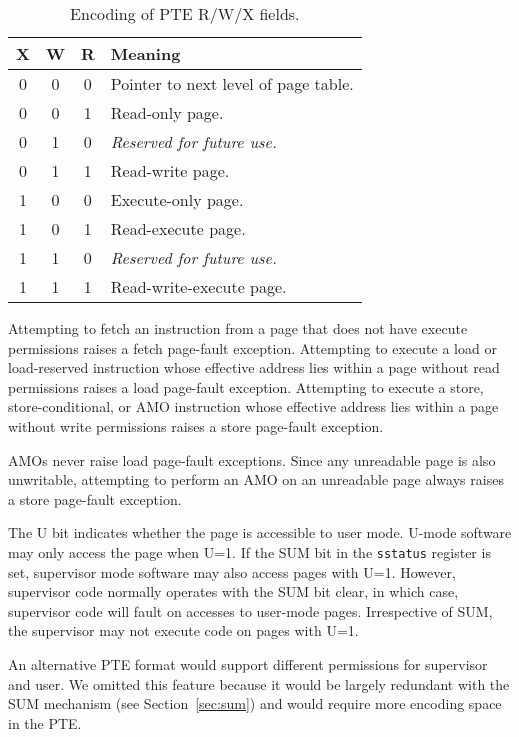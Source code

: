 \begin{table*}[h!]
\begin{center}
\begin{tabular}{|c|c|c||l|}
\hline
X & W & R & Meaning \\
\hline
0 & 0 & 0 & Pointer to next level of page table. \\
0 & 0 & 1 & Read-only page. \\
0 & 1 & 0 & {\em Reserved for future use.} \\
0 & 1 & 1 & Read-write page. \\
1 & 0 & 0 & Execute-only page. \\
1 & 0 & 1 & Read-execute page. \\
1 & 1 & 0 & {\em Reserved for future use.} \\
1 & 1 & 1 & Read-write-execute page. \\
\hline
\end{tabular}
\end{center}
\caption{Encoding of PTE R/W/X fields.}
\label{pteperm}
\end{table*}

Attempting to fetch an instruction from a page that does not have execute
permissions raises a fetch page-fault exception.  Attempting to execute
a load or load-reserved instruction whose effective address lies within
a page without read permissions raises a load page-fault exception.
Attempting to execute a store, store-conditional,
or AMO instruction whose effective address lies within a page without
write permissions raises a store page-fault exception.
\begin{commentary}
AMOs never raise load page-fault exceptions.  Since any unreadable page is
also unwritable, attempting to perform an AMO on an unreadable page always
raises a store page-fault exception.
\end{commentary}

The U bit indicates whether the page is accessible to user mode.
U-mode software may only access the page when U=1.  If the SUM bit
in the {\tt sstatus} register is
set, supervisor mode software may also access pages with U=1.
However, supervisor code normally operates with the SUM bit clear, in
which case, supervisor code will fault on accesses to user-mode pages.
Irrespective of SUM, the supervisor may not execute code on pages with U=1.

\begin{commentary}
An alternative PTE format would support different permissions for supervisor
and user.  We omitted this feature because it would be largely redundant with
the SUM mechanism (see Section~\ref{sec:sum}) and would require more encoding
space in the PTE.
\end{commentary}

